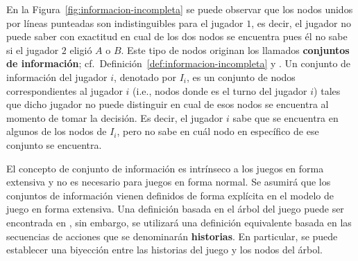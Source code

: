 En la Figura~\ref{fig:informacion-incompleta} se puede observar que los nodos unidos por líneas punteadas son indistinguibles para el jugador $1$, es decir, el jugador no puede saber con exactitud en cual de los dos nodos se encuentra pues él no sabe si el jugador $2$ eligió $A$ o $B$. Este tipo de nodos originan los llamados \textbf{conjuntos de información}; cf.\ Definición~\ref{def:informacion-incompleta} y \cite[p.~200]{bib:course-game-theory}. Un conjunto de información del jugador $i$, denotado por $I_i$, es un conjunto de nodos correspondientes al jugador $i$ (i.e., nodos donde es el turno del jugador $i$) tales que dicho jugador no puede distinguir en cual de esos nodos se encuentra al momento de tomar la decisión. Es decir, el jugador $i$ sabe que se encuentra en algunos de los nodos de $I_i$, pero no sabe en cuál nodo en específico de ese conjunto se encuentra.

El concepto de conjunto de información es intrínseco a los juegos en forma extensiva y no es necesario para juegos en forma normal. Se asumirá que los conjuntos de información vienen definidos de forma explícita en el modelo de juego en forma extensiva. Una definición basada en el árbol del juego puede ser encontrada en \cite{bib:conceptos-basicos}, sin embargo, se utilizará una definición equivalente basada en las secuencias de acciones que se denominarán \textbf{historias}. En particular, se puede establecer una biyección entre las historias del juego y los nodos del árbol.

